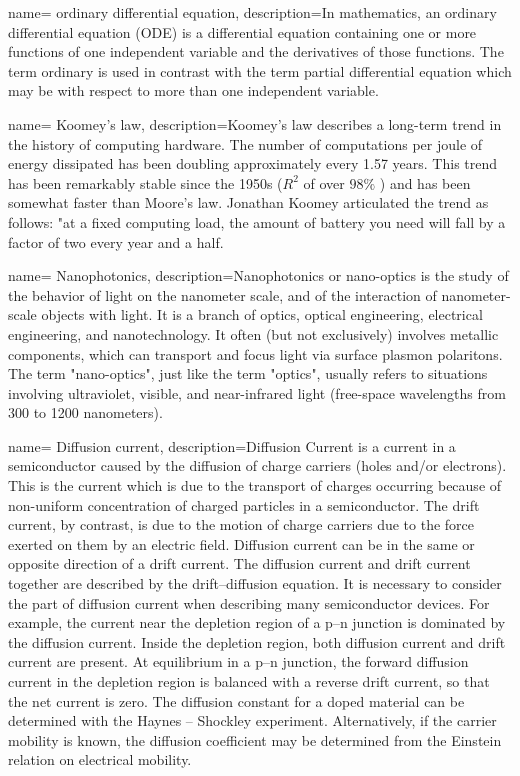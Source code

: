{
        name= ordinary differential equation,
        description={In mathematics, an ordinary differential equation (ODE) is a differential equation containing one or more functions of one independent variable and the derivatives of those functions. The term ordinary is used in contrast with the term partial differential equation which may be with respect to more than one independent variable.}
}

{
        name= Koomey's law,
        description={Koomey's law describes a long-term trend in the history of computing hardware. The number of computations per joule of energy dissipated has been doubling approximately every 1.57 years. This trend has been remarkably stable since the 1950s ($R^2$ of over $98\%$ ) and has been somewhat faster than Moore's law. Jonathan Koomey articulated the trend as follows: "at a fixed computing load, the amount of battery you need will fall by a factor of two every year and a half.}
}

{
        name= Nanophotonics,
        description={Nanophotonics or nano-optics is the study of the behavior of light on the nanometer scale, and of the interaction of nanometer-scale objects with light. It is a branch of optics, optical engineering, electrical engineering, and nanotechnology. It often (but not exclusively) involves metallic components, which can transport and focus light via surface plasmon polaritons. The term "nano-optics", just like the term "optics", usually refers to situations involving ultraviolet, visible, and near-infrared light (free-space wavelengths from 300 to 1200 nanometers).}
}
 
{
        name= Diffusion current,
        description={Diffusion Current is a current in a semiconductor caused by the diffusion of charge carriers (holes and/or electrons). This is the current which is due to the transport of charges occurring because of non-uniform concentration of charged particles in a semiconductor. The drift current, by contrast, is due to the motion of charge carriers due to the force exerted on them by an electric field. Diffusion current can be in the same or opposite direction of a drift current. The diffusion current and drift current together are described by the drift–diffusion equation. It is necessary to consider the part of diffusion current when describing many semiconductor devices. For example, the current near the depletion region of a p–n junction is dominated by the diffusion current. Inside the depletion region, both diffusion current and drift current are present. At equilibrium in a p–n junction, the forward diffusion current in the depletion region is balanced with a reverse drift current, so that the net current is zero. The diffusion constant for a doped material can be determined with the Haynes – Shockley experiment. Alternatively, if the carrier mobility is known, the diffusion coefficient may be determined from the Einstein relation on electrical mobility.}
}

